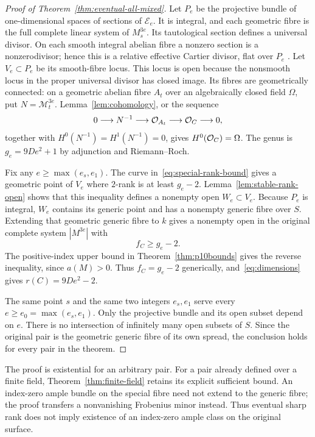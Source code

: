 \begin{proof}[Proof of Theorem~\ref{thm:eventual-all-mixed}]
Let $P_e$ be the projective bundle of one-dimensional spaces of sections of $\mathcal E_e$. It is integral, and each geometric fibre is the full complete linear system of $M_s^{3e}$. Its tautological section defines a universal divisor. On each smooth integral abelian fibre a nonzero section is a nonzerodivisor; hence this is a relative effective Cartier divisor, flat over $P_e$ \citep[Tag~062Y]{Stacks}. Let $V_e\subset P_e$ be its smooth-fibre locus. This locus is open because the nonsmooth locus in the proper universal divisor has closed image. Its fibres are geometrically connected: on a geometric abelian fibre $A_t$ over an algebraically closed field $\Omega$, put $N=\mathcal M_t^{3e}$. Lemma~\ref{lem:cohomology}, or the sequence
\[
 0\longrightarrow N^{-1}\longrightarrow\mathcal O_{A_t}
       \longrightarrow\mathcal O_C\longrightarrow0,
\]
together with $H^0(N^{-1})=H^1(N^{-1})=0$, gives $H^0(\mathcal O_C)=\Omega$. The genus is $g_e=9De^2+1$ by adjunction and Riemann--Roch.

Fix any $e\ge\max(e_s,e_1)$. The curve in~\eqref{eq:special-rank-bound} gives a geometric point of $V_e$ where $2$-rank is at least $g_e-2$. Lemma~\ref{lem:stable-rank-open} shows that this inequality defines a nonempty open $W_e\subset V_e$. Because $P_e$ is integral, $W_e$ contains its generic point and has a nonempty generic fibre over $S$. Extending that geometric generic fibre to $k$ gives a nonempty open in the original complete system $|M^{3e}|$ with
\[
                             f_C\ge g_e-2.
\]
The positive-index upper bound in Theorem~\ref{thm:p10bounds} gives the reverse inequality, since $a(M)>0$. Thus $f_C=g_e-2$ generically, and~\eqref{eq:dimensions} gives $r(C)=9De^2-2$.

The same point $s$ and the same two integers $e_s,e_1$ serve every $e\ge e_0=\max(e_s,e_1)$. Only the projective bundle and its open subset depend on $e$. There is no intersection of infinitely many open subsets of $S$. Since the original pair is the geometric generic fibre of its own spread, the conclusion holds for every pair in the theorem.
\end{proof}

The proof is existential for an arbitrary pair. For a pair already defined over a finite field, Theorem~\ref{thm:finite-field} retains its explicit sufficient bound. An index-zero ample bundle on the special fibre need not extend to the generic fibre; the proof transfers a nonvanishing Frobenius minor instead. Thus eventual sharp rank does not imply existence of an index-zero ample class on the original surface.
